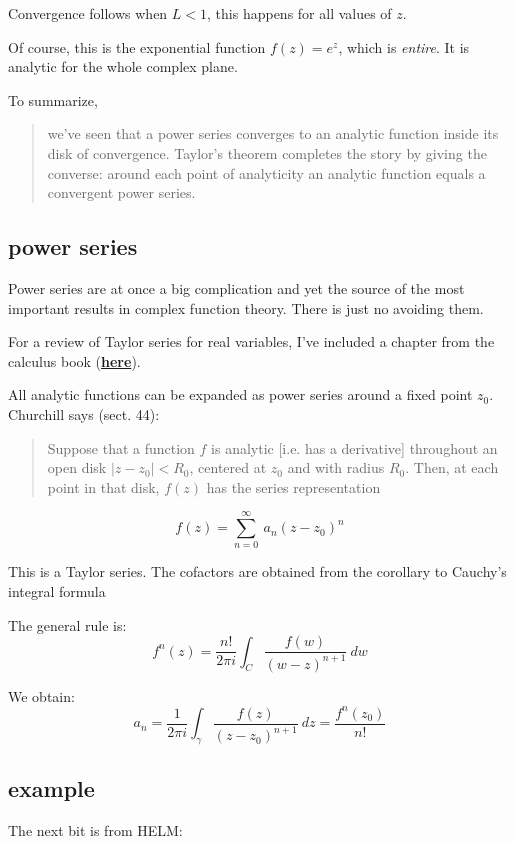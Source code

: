 \documentclass[11pt, oneside]{article}
\begin{document}
Convergence follows when $L < 1$, this happens for all values of $z$.

Of course, this is the exponential function $f(z) = e^z$, which is \emph{entire}.  It is analytic for the whole complex plane.

To summarize, 

\begin{quote}we've seen that a power series converges to an analytic function inside its disk of convergence. Taylor’s theorem completes the story by giving the converse: around each point of analyticity an analytic function equals a convergent power series.\end{quote}

\subsection*{power series}

Power series are at once a big complication and yet the source of the most important results in complex function theory.  There is just no avoiding them.

For a review of Taylor series for real variables, I've included a chapter from the calculus book (\hyperref[sec:taylor_real]{\textbf{here}}).

All analytic functions can be expanded as power series around a fixed point $z_0$.  Churchill says (sect. 44):

\begin{quote}Suppose that a function $f$ is analytic [i.e. has a derivative] throughout an open disk $|z - z_0| < R_0$, centered at $z_0$ and with radius $R_0$.  Then, at each point in that disk, $f(z)$ has the series representation\end{quote}

\[ f(z) = \sum_{n=0}^{\infty} \ a_n(z - z_0)^n \]

This is a Taylor series.  The cofactors are obtained from the corollary to Cauchy's integral formula

The general rule is:
\[ f^n(z) = \frac{n!}{2 \pi i} \int_C \frac{f(w)}{(w - z)^{n+1}} \ dw \]

We obtain:
\[ a_n = \frac{1}{2 \pi i} \int_{\gamma} \frac{f(z)}{(z - z_0)^{n+1}} \ dz = \frac{f^n (z_0)}{n!} \]

\subsection*{example}

The next bit is from HELM:
\end{document}
